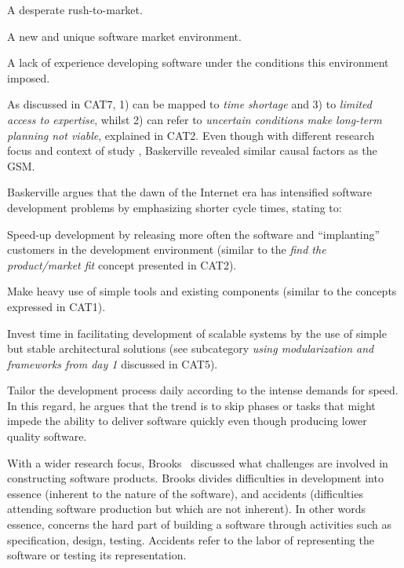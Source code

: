 \documentclass[10pt,journal,letterpaper,compsoc]{IEEEtran}
\begin{document}
\begin{compactenum}

\item A desperate rush-to-market. 
\item A new and unique software market environment. 
\item A lack of experience developing software under the conditions this 
environment imposed.

\end{compactenum}

As discussed in CAT7, 1) can be mapped to \textit{time shortage} and 3) to
\textit{limited access to expertise}, whilst 2) can refer to \textit{uncertain
conditions make long-term planning not viable}, explained in CAT2. Even though
with different research focus and context of study %
, Baskerville revealed similar causal factors as the GSM.

Baskerville argues that the dawn of the Internet era has intensified software
development problems by emphasizing shorter cycle times, stating to:

\begin{compactitem} 
\item Speed-up development by releasing more often the software and 
``implanting'' customers in the development environment (similar
to the \textit{find the product/market fit} concept presented in CAT2).
\item Make heavy use of simple tools and existing components (similar to the 
concepts expressed in CAT1). 
\item Invest time in facilitating development of scalable systems by the use of 
simple but stable architectural solutions (see subcategory \textit{using 
modularization and frameworks from day 1} discussed
in CAT5).
\item Tailor the development process daily according to the intense demands for 
speed. In this regard, he argues that the trend is to skip phases or tasks that 
might impede the ability to deliver software quickly even though producing lower 
quality software.
\end{compactitem}

With a wider research focus, Brooks~\cite{BrooksJr1987} discussed what
challenges are involved in constructing software products. Brooks divides
difficulties in development into essence (inherent to the nature of the
software), and accidents (difficulties attending software production but which
are not inherent). In other words essence, concerns the hard part of building a
software through activities such as specification, design, testing. Accidents
refer to the labor of representing the software or testing its representation.
\end{document}
